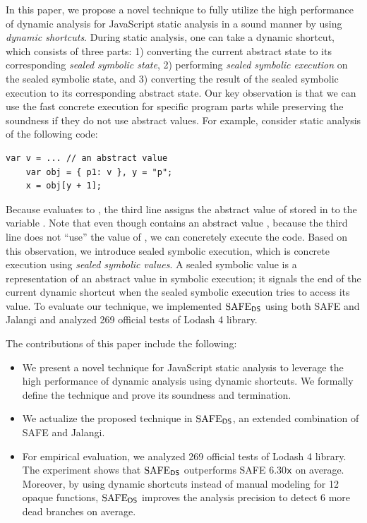 In this paper, we propose a novel technique to fully utilize
the high performance of dynamic analysis for JavaScript static
analysis in a sound manner by using \textit{dynamic shortcuts}.
During static analysis, one can take a dynamic shortcut, which
consists of three parts: 1) converting the current abstract state to
its corresponding \textit{sealed symbolic state}, 2) performing
\textit{sealed symbolic execution} on the sealed symbolic state, and
3) converting the result of the sealed symbolic execution to its
corresponding abstract state.  Our key observation is that we can use
the fast concrete execution for specific program parts while
preserving the soundness if they do not use abstract values.
For example, consider static analysis of the following code:
\begin{lstlisting}[style=myJSstyle,numbers=none]
    var v = ... // an abstract value
    var obj = { p1: v }, y = "p";
    x = obj[y + 1];
\end{lstlisting}
Because  evaluates to ,
the third line assigns the abstract value of  stored in
 to the variable .
Note that even though  contains an abstract value ,
because the third line does not ``use'' the value of ,
we can concretely execute the code.  Based on this observation,
we introduce sealed symbolic execution, which is concrete execution
using \textit{sealed symbolic values}.  A sealed symbolic value is a
representation of an abstract value in symbolic execution; it signals
the end of the current dynamic shortcut when the sealed symbolic
execution tries to access its value.
To evaluate our technique, we implemented $\text{SAFE}_{\textsf{DS}}$ using both SAFE
and Jalangi and analyzed 269 official tests of Lodash 4 library.

The contributions of this paper include the following:
\begin{itemize}
\item We present a novel technique for JavaScript static
analysis to leverage the high performance of dynamic analysis using
dynamic shortcuts.  We formally define the technique and prove
its soundness and termination.
\item We actualize the proposed technique in $\text{SAFE}_{\textsf{DS}}$, an
extended combination of SAFE and Jalangi.
\item For empirical evaluation, we analyzed 269 official tests of
Lodash 4 library.  The experiment shows that $\text{SAFE}_{\textsf{DS}}$ outperforms
SAFE 6.30${\textsf{x}}$ on average.  Moreover, by using dynamic shortcuts
instead of manual modeling for 12 opaque functions,
$\text{SAFE}_{\textsf{DS}}$ improves the analysis precision to detect 6 more dead branches on
average.
\end{itemize}

